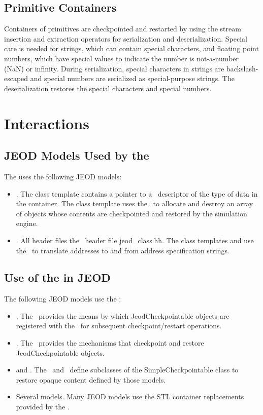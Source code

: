 \subsection{Primitive Containers}
Containers of primitives are checkpointed and restarted by using the
stream insertion and extraction operators for serialization and deserialization.
Special care is needed for strings, which can contain special characters, and floating point numbers, which have special
values to indicate the number is not-a-number (NaN) or infinity.
During serialization, special characters in strings are backslash-escaped
and  special numbers are serialized  as special-purpose strings.
The deserialization restores the special characters and special numbers. 

\section{Interactions}
\label{sec:interactions}

\subsection{JEOD Models Used by the \ModelDesc}
The \ModelDesc uses the following JEOD models:
\begin{itemize}
\item{}.
  The class template  contains a pointer to
  a \MEMORY\ descriptor of the type of data in the container.
  The class template  uses the \MEMORY\ to
  allocate and destroy an array of objects whose contents
  are checkpointed and restored by the simulation engine.
\item{}.
  All \ModelDesc header files
   the \SIMINTERFACE\ header file jeod\_class.hh.
  The class templates
   and 
  use the \SIMINTERFACE\ to translate addresses to and from
  address specification strings.
\end{itemize}

\subsection{Use of the \ModelDesc in JEOD}
The following JEOD models use the \ModelDesc:
\begin{itemize}
\item{}.
  The \MEMORY\ provides the means by which JeodCheckpointable objects
  are registered with the \SIMINTERFACE\ for subsequent checkpoint/restart
  operations.
\item{}.
  The \SIMINTERFACE\ provides the mechanisms that checkpoint and restore
  JeodCheckpointable objects.
\item {} and .
  The \EPHEMERIDES\ and \DYNBODY\ define subclasses of the SimpleCheckpointable
  class to restore opaque content defined by those models.
\item Several models.
  Many JEOD models use the STL container replacements provided
  by the \ModelDesc.
\end{itemize}

